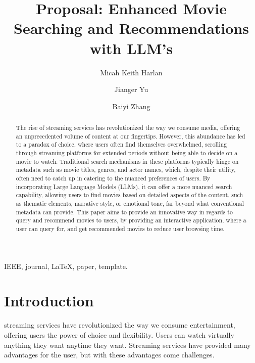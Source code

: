 \documentclass[journal]{IEEEtran}
\begin{document}
\title{Proposal: Enhanced Movie Searching and Recommendations with LLM’s}

\author[1]{Micah Keith Harlan}
\author[1]{Jianger Yu}
\author[1]{Baiyi Zhang}


\maketitle

\begin{abstract}
The rise of streaming services has revolutionized the way we consume media, offering an unprecedented volume of content at our fingertips. However, this abundance has led to a paradox of choice, where users often find themselves overwhelmed, scrolling through streaming platforms for extended periods without being able to decide on a movie to watch. Traditional search mechanisms in these platforms typically hinge on metadata such as movie titles, genres, and actor names, which, despite their utility, often need to catch up in catering to the nuanced preferences of users. By incorporating Large Language Models (LLMs), it can offer a more nuanced search capability, allowing users to find movies based on detailed aspects of the content, such as thematic elements, narrative style, or emotional tone, far beyond what conventional metadata can provide. This paper aims to provide an innovative way in regards to query and recommend movies to users, by providing an interactive application, where a user can query for, and get recommended movies to reduce user browsing time.
\end{abstract}

\begin{IEEEkeywords}
IEEE, journal, \LaTeX, paper, template.
\end{IEEEkeywords}

\section{Introduction}
 streaming services have revolutionized the way we consume entertainment, offering users the power of choice and flexibility. Users can watch virtually anything they want anytime they want. Streaming services have provided many advantages for the user, but with these advantages come challenges. 
\end{document}

